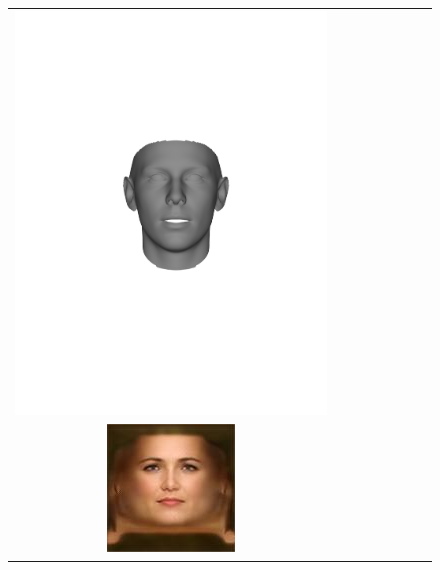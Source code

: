 \begin{figure}[t!]
\begin{center}
\begin{tabular}{ @{\hskip 1.5mm}c@{}c@{\hskip 1.5mm}c@{}c@{}c@{}c@{}c@{\hskip 1.5mm}c@{}}
\includegraphics[trim=150 250 175 250,clip, width=\afifthcolumn]{img/representation/pred_shape_Pale_Skin.pdf} &
\\ 
\includegraphics[width=\afifthcolumn]{img/representation/pred_tex_no_Male.jpg} &

\end{tabular}
\end{center}
\end{figure}
